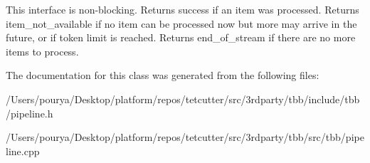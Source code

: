 This interface is non-\/blocking. Returns \textquotesingle{}success\textquotesingle{} if an item was processed. Returns \textquotesingle{}item\+\_\+not\+\_\+available\textquotesingle{} if no item can be processed now but more may arrive in the future, or if token limit is reached. Returns \textquotesingle{}end\+\_\+of\+\_\+stream\textquotesingle{} if there are no more items to process. 

The documentation for this class was generated from the following files\+:\begin{DoxyCompactItemize}
\item 
/\+Users/pourya/\+Desktop/platform/repos/tetcutter/src/3rdparty/tbb/include/tbb/pipeline.\+h\item 
/\+Users/pourya/\+Desktop/platform/repos/tetcutter/src/3rdparty/tbb/src/tbb/pipeline.\+cpp\end{DoxyCompactItemize}
